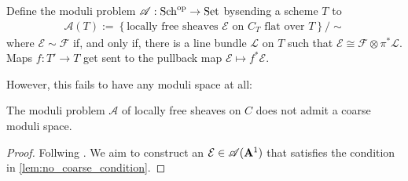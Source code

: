 \documentclass[12pt]{ociamthesis}  %
\begin{document}
\begin{definition}
  Define the moduli problem $\mathscr A : \operatorname{Sch}^{\text{op}} \to \operatorname{Set}$
  bysending a scheme $T$ to
  \begin{align*}
    \mathscr A(T) := \left\lbrace{\text{locally free sheaves $\mathcal E$ on $C_T$ flat over $T$}}\right\rbrace/\sim
  \end{align*}
  where $\mathcal E\sim\mathcal F$ if, and only if, there is a line bundle
  $\mathcal L$ on $T$ such that
  $\mathcal E \cong \mathcal F\otimes\pi^* \mathcal L$. Maps
  $f: T'\to T$ get sent to the pullback map
  $\mathcal E\mapsto f^*\mathcal E$.
\end{definition}

However, this fails to have any moduli space at all:

\begin{lemma}\label{lem:no_coarse_moduli_space}
  The moduli problem $\mathscr A$ of locally free sheaves on $C$
  does not admit a coarse moduli space.
  \begin{proof}
    Follwing \cite[Example 2.2]{hoskins2016}. We aim to construct
    an $\mathcal E\in\mathscr A(\mathbf{A}^{1}_{})$ that satisfies the
    condition in \ref{lem:no_coarse_condition}.
    \missingproof
  \end{proof}
\end{lemma}
\end{document}
